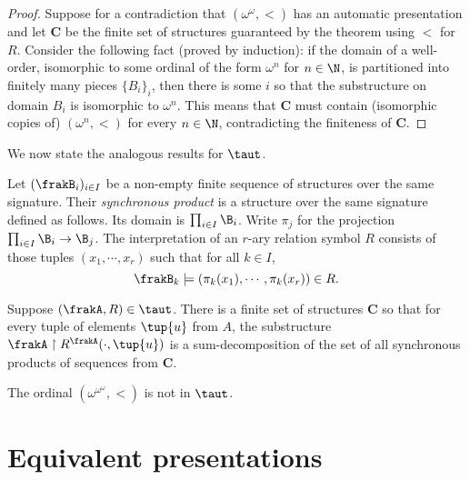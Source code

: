 \begin{proof}
Suppose for a contradiction that $(\omega^\omega,<)$ has an automatic presentation and let $\mathbf{C}$ be the finite set of structures
guaranteed by the theorem using $<$ for $R$.
Consider the following fact (proved by induction): if the domain of a well-order,
isomorphic to some ordinal of the form $\omega^n$ for $n \in \N$, is
partitioned into finitely many pieces $\{B_i\}_i$, then there is some $i$ so
that the substructure on domain $B_i$ is isomorphic to $\omega^n$.
This means that $\mathbf{C}$ must contain (isomorphic copies of) $(\omega^n,<)$ for every $n \in \N$, contradicting
the finiteness of $\mathbf{C}$.
\end{proof}


We now state the analogous results for $\taut$.

\begin{definition}
Let $(\frakB_i)_{i \in I}$ be a non-empty finite sequence of structures over the same signature. Their {\em synchronous product} is a structure over the same signature 
defined as follows. Its domain is $\prod_{i \in I} \B_i$. Write $\pi_j$ for the projection $\prod_{i \in I} \B_i \to \B_j$. The interpretation of an $r$-ary relation symbol $R$
consists of those tuples $(x_1,\cdots,x_r)$ such that for all $k \in I$, 
\[
\frakB_k \models (\pi_k(x_1),\cdots,\pi_k(x_r)) \in R .
\]
\end{definition}

\begin{theorem}
Suppose $(\frakA,R) \in \taut$.
There is a finite set of structures $\mathbf{C}$ so that for every tuple of elements $\tup{u}$ from $A$, the
substructure ${\frakA} \restriction R^{\frakA}(\cdot,\tup{u})$ is a sum-decomposition of the set
of all synchronous products of sequences from $\mathbf{C}$.
\end{theorem}

\begin{corollary}
The ordinal $(\omega^{\omega^{\omega}},<)$ is not in $\taut$.
\end{corollary}


\section{Equivalent presentations} \label{AS:sec:equiv}

